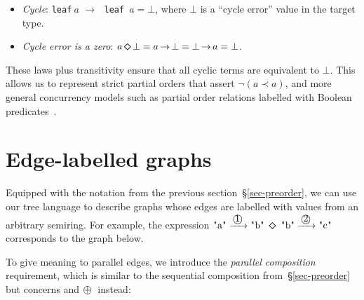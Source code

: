 \documentclass[english,submission]{programming}
\newcommand{\code}[1]{\lstinline[mathescape]|#1|}
\newcommand{\hcode}[1]{{\color{darkblue} \lstinline[keywordstyle={}]|#1|}} %
\newcommand{\hdia}{\,\text{\raisebox{-0.2mm}{\Large\color{darkblue} $\diamond$}}\,}
\newcommand{\add}{\text{\raisebox{-0.1mm}{\large $\oplus$}}}
\newcommand{\zero}{\raisebox{-0.2mm}{\textcircled{\textsf{0}}}\xspace}
\newcommand{\one}{\raisebox{-0.2mm}{\textcircled{\textsf{\hspace{-0.2mm}1}}}\xspace}
\newcommand{\two}{\raisebox{-0.2mm}{\textcircled{2}}\xspace}
\newcommand{\dia}{\,\text{\raisebox{-0.3mm}{\Large $\diamond$}}\,}
\newcommand{\arr}{\,\text{$\rightarrow$}\,}
\begin{document}
\begin{itemize}
    \item \emph{Cycle}:
    \hcode{leaf}$~a\,\arr\,$\hcode{leaf}~$a = \bot$, where $\bot$ is a
    ``cycle error'' value in the target type.
    \item \emph{Cycle error is a zero}: $a \dia \bot = a \arr \bot = \bot \arr a = \bot$.
\end{itemize}

\noindent
These laws plus transitivity ensure that all cyclic terms are equivalent to
$\bot$. This allows us to represent strict partial orders that assert
$\neg (a \prec a)$, and more general concurrency models such as partial order relations labelled with Boolean predicates~\cite{mokhov2009cpog}.


\section{Edge-labelled graphs}\label{sec-labelled}


Equipped with the notation from the previous section~\S\ref{sec-preorder}, we
can use our tree language to describe graphs whose edges are labelled with
values from an arbitrary semiring. For example, the expression
$\text{\code{"a"}} \xrightarrow{\,\one\,} \text{\code{"b"}}\ \dia\ \text{\code{"b"}} \xrightarrow{\,\two\,} \text{\code{"c"}}$
corresponds to the graph below.

\vspace{3mm}
\hfill\hfill
\vspace{3mm}

%

\noindent
To give meaning to parallel edges, we introduce the \emph{parallel composition}
requirement, which is similar to the sequential composition
from~\S\ref{sec-preorder} but concerns \zero and $\add$~instead:
\end{document}
